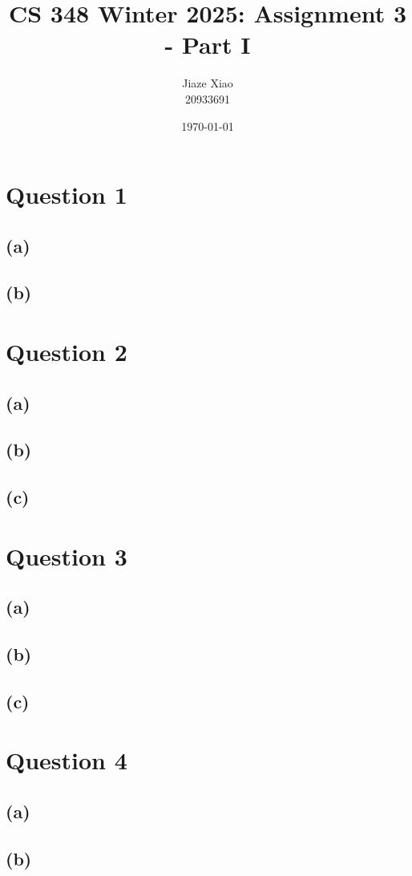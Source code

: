 \documentclass{article}
\title{\textbf{CS 348 Winter 2025: Assignment 3 - Part I}}
\author{Jiaze Xiao \\ 20933691}
\date{\today}
\begin{document}
\maketitle

\section*{Question 1}
\subsection*{(a)}

\subsection*{(b)}

\newpage
\section*{Question 2}
\subsection*{(a)}

\newpage
\subsection*{(b)}

\subsection*{(c)}

\newpage
\section*{Question 3}
\subsection*{(a)}

\newpage
\subsection*{(b)}

\subsection*{(c)}

\newpage
\section*{Question 4}
\subsection*{(a)}

\newpage
\subsection*{(b)}
\end{document}
